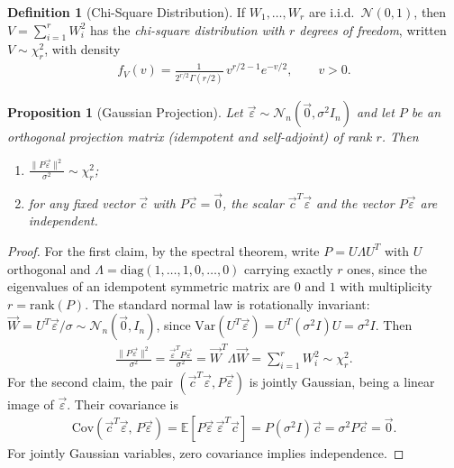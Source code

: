\documentclass[11pt]{article}
\theoremstyle{definition}
\newtheorem{definition}{Definition}[section]
\theoremstyle{plain}
\newtheorem{proposition}{Proposition}[section]
\theoremstyle{remark}
\begin{document}
\begin{definition}[Chi-Square Distribution]
    If $W_1,\dots,W_r$ are i.i.d.\ $\mathcal{N}(0,1)$, then $V = \sum_{i=1}^r W_i^2$ has the \emph{chi-square distribution with $r$ degrees of freedom}, written $V \sim \chi^2_r$, with density
    \begin{align}
        f_V(v) = \frac{1}{2^{r/2}\Gamma(r/2)}\,v^{r/2 - 1}e^{-v/2}, \qquad v > 0.
    \end{align}
\end{definition}

\begin{proposition}[Gaussian Projection]\label{prop:proj}
    Let $\vec{\varepsilon} \sim \mathcal{N}_n(\vec{0}, \sigma^2 I_n)$ and let $P$ be an orthogonal projection matrix (idempotent and self-adjoint) of rank $r$. Then
    \begin{enumerate}[noitemsep]
        \item $\displaystyle \frac{\|P\vec{\varepsilon}\|^2}{\sigma^2} \sim \chi^2_r$;
        \item for any fixed vector $\vec{c}$ with $P\vec{c} = \vec{0}$, the scalar $\vec{c}^T\vec{\varepsilon}$ and the vector $P\vec{\varepsilon}$ are independent.
    \end{enumerate}
\end{proposition}
\begin{proof}
    For the first claim, by the spectral theorem, write $P = U\Lambda U^T$ with $U$ orthogonal and $\Lambda = \mathrm{diag}(1,\dots,1,0,\dots,0)$ carrying exactly $r$ ones, since the eigenvalues of an idempotent symmetric matrix are $0$ and $1$ with multiplicity $r = \mathrm{rank}(P)$. The standard normal law is rotationally invariant: $\vec{W} = U^T\vec{\varepsilon}/\sigma \sim \mathcal{N}_n(\vec{0}, I_n)$, since $\mathrm{Var}(U^T\vec{\varepsilon}) = U^T(\sigma^2 I)U = \sigma^2 I$. Then
    \begin{align}
        \frac{\|P\vec{\varepsilon}\|^2}{\sigma^2} = \frac{\vec{\varepsilon}^TP\vec{\varepsilon}}{\sigma^2} = \vec{W}^T\Lambda\vec{W} = \sum_{i=1}^r W_i^2 \sim \chi^2_r.
    \end{align}
    For the second claim, the pair $(\vec{c}^T\vec{\varepsilon}, P\vec{\varepsilon})$ is jointly Gaussian, being a linear image of $\vec{\varepsilon}$. Their covariance is
    \begin{align}
        \mathrm{Cov}\!\left(\vec{c}^T\vec{\varepsilon},\, P\vec{\varepsilon}\right) = \mathbb{E}\!\left[P\vec{\varepsilon}\,\vec{\varepsilon}^T\vec{c}\right] = P(\sigma^2 I)\vec{c} = \sigma^2 P\vec{c} = \vec{0}.
    \end{align}
    For jointly Gaussian variables, zero covariance implies independence.
\end{proof}
\end{document}
